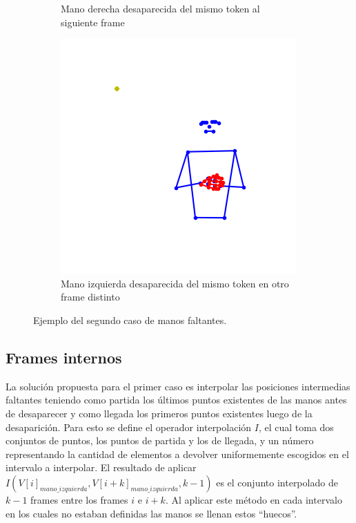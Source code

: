 \begin{figure}[t]
\begin{subfigure}[t]{0.3\textwidth}
		\caption{Mano derecha desaparecida del mismo token al siguiente frame }
		\label{f:mano_derecha_desaparecida}
	\end{subfigure}
		\begin{subfigure}[t]{0.3\textwidth}
	\centering
		\includegraphics[align=t,width=0.9\linewidth, height =0.9\linewidth]{Graphics/mano_faltante_interna.png}
		\caption{Mano izquierda desaparecida del mismo token en otro frame distinto}
		\label{f:mano_izquierda_desaparecida}
	\end{subfigure}
	\caption{Ejemplo del segundo caso de  manos faltantes.}
	\label{f:manos_faltantes}
\end{figure}

\subsection{Frames internos}
La solución propuesta para el primer caso es interpolar las posiciones intermedias faltantes teniendo como 
partida los últimos puntos existentes de las manos antes de desaparecer y como llegada los primeros puntos existentes 
luego de la desaparición. Para esto se define el operador interpolación $I$, el cual toma dos conjuntos de puntos, los 
puntos de partida y los de llegada, y un número representando la cantidad de elementos a devolver uniformemente
escogidos en el intervalo a interpolar. El resultado de aplicar 
$I(V[i]_{mano\_izquierda}, V[i + k]_{mano\_izquierda}, k - 1)$ es el conjunto interpolado de $k-1$ frames 
entre los frames $i$ e $i+k$. Al aplicar este método en cada intervalo en los cuales no estaban definidas las manos 
se llenan estos ``huecos''.
